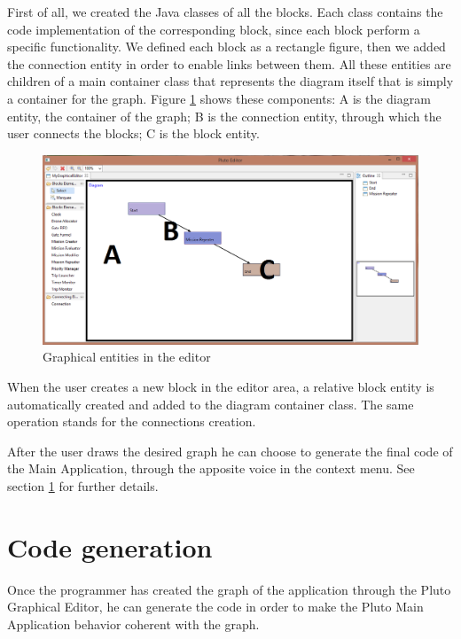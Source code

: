 First of all, we created the Java classes of all the blocks.
Each class contains the code implementation of the corresponding block, since each block perform a specific functionality.
We defined each block as a rectangle figure, then we added the connection entity in order to enable links between them.
All these entities are children of a main container class that represents the diagram itself that is simply a container for the graph.
Figure \ref{fig:editorExplanation} shows these components: A is the diagram entity, the container of the graph; B is the connection entity, through which the user connects the blocks; C is the block entity. 
\\

\newpage

\begin{figure}[h!]
\includegraphics[width=\linewidth]
{pictures/editorExplanation.png}
\caption{Graphical entities in the editor}
\label{fig:editorExplanation}
\end{figure}

When the user creates a new  block in the editor area, a relative block entity is automatically created and added to the diagram container class. The same operation stands for the connections creation.

After the user draws the desired graph he can choose to generate the final code of the Main Application, through the apposite voice in the context menu.
See section \ref{codeGeneration} for further details.
\\

\section{Code generation}\label{codeGeneration}

Once the programmer has created the graph of the application through the Pluto Graphical Editor, he can generate the code in order to make the Pluto Main Application behavior coherent with the graph.

